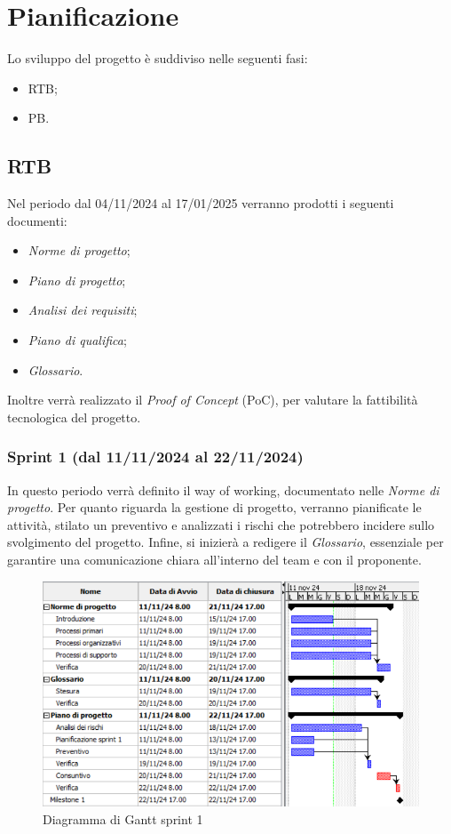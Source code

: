 \section{Pianificazione}
Lo sviluppo del progetto è suddiviso nelle seguenti fasi:
    \begin{itemize}
        \item RTB;
        \item PB.
    \end{itemize}
    \subsection{RTB}
    Nel periodo dal 04/11/2024 al 17/01/2025 verranno prodotti i seguenti documenti:
        \begin{itemize}
            \item \textit{Norme di progetto};
            \item \textit{Piano di progetto};
            \item \textit{Analisi dei requisiti};
            \item \textit{Piano di qualifica};
            \item \textit{Glossario}.
        \end{itemize}
        Inoltre verrà realizzato il \textit{Proof of Concept} (PoC), per valutare la fattibilità tecnologica del progetto.
        \subsubsection{Sprint 1 (dal 11/11/2024 al 22/11/2024)}
        In questo periodo verrà definito il way of working, documentato nelle
        \textit{Norme di progetto}. Per quanto riguarda la gestione di progetto, verranno 
        pianificate le attività, stilato un preventivo e analizzati i rischi che potrebbero
        incidere sullo svolgimento del progetto. 
        Infine, si inizierà a redigere il \textit{Glossario}, essenziale per garantire una comunicazione chiara all'interno del team e con il proponente.
        \\
        \begin{figure}[h!]
            \centering
            \includegraphics[scale = 0.85]{template/images/gantt1.png}
            \caption{Diagramma di Gantt sprint 1}
            \label{fig:3.1} %
        \end{figure}

